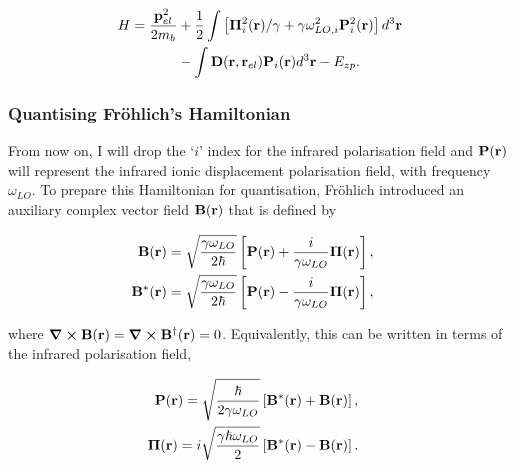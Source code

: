 \begin{equation}
\begin{aligned}
    H = \frac{\vb{p}_{el}^2}{2 m_b} &+ \frac{1}{2} \int \left[\vb{\Pi}_{i}^2(\vb{r})/\gamma + \gamma\omega_{LO, i}^2 \vb{P}^2_i (\vb{r}) \right] d^3 \vb{r} \\
    &- \int \vb{D}(\vb{r},\vb{r}_{el})\vb{P}_i(\vb{r}) d^3\vb{r} - E_{zp} .
\end{aligned}
\label{eqn:frohlich_hamiltonian_slow}
\end{equation}

\subsubsection{Quantising Fr\"ohlich's Hamiltonian}
\label{subsubsec:2-1-2-2}

From now on, I will drop the `$i$' index for the infrared polarisation field and $\vb{P}(\vb{r})$ will represent the infrared ionic displacement polarisation field, with frequency $\omega_{LO}$. To prepare this Hamiltonian for quantisation, Fr\"ohlich introduced an auxiliary complex vector field $\vb{B}(\vb{r})$ that is defined by

\begin{subequations}
\begin{align}
    \begin{split}
    \vb{B}(\vb{r}) &= \sqrt{\frac{\gamma \omega_{LO}}{2\hbar}} \left[ \vb{P}(\vb{r}) + \frac{i}{\gamma\omega_{LO}} \vb{\Pi}(\vb{r})\right],
    \end{split}\\
    \begin{split}
    \vb{B}^*(\vb{r}) &= \sqrt{\frac{\gamma \omega_{LO}}{2\hbar}} \left[ \vb{P}(\vb{r}) - \frac{i}{\gamma\omega_{LO}} \vb{\Pi}(\vb{r})\right],
    \end{split}
\end{align}
\end{subequations}

where $\curl \vb{B}(\vb{r}) = \curl \vb{B}^\dagger(\vb{r}) = 0$. Equivalently, this can be written in terms of the infrared polarisation field,

\begin{subequations}
\begin{align}
    \begin{split}
    \vb{P}(\vb{r}) &= \sqrt{\frac{\hbar}{2\gamma\omega_{LO}}} \left[\vb{B}^*(\vb{r}) + \vb{B}(\vb{r})\right],
    \end{split}\\
    \begin{split}
    \vb{\Pi}(\vb{r}) &= i \sqrt{\frac{\gamma\hbar\omega_{LO}}{2}} \left[\vb{B}^*(\vb{r}) - \vb{B}(\vb{r})\right].
    \end{split}
\end{align}
\end{subequations}

